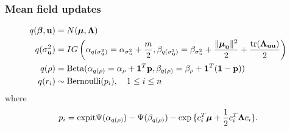 \documentclass{beamer}
\begin{document}
\begin{frame}
\frametitle{Mean field updates}
\begin{align*}
q({\boldsymbol \beta}, {\bf u}) &= N({\boldsymbol \mu}, {\boldsymbol \Lambda}) \\
q(\sigma_{{\bf u}}^2) &= IG\left(\alpha_{q(\sigma_{{\bf u}}^2)} = \alpha_{\sigma_u^2} + \frac{m}{2}, \beta_{q(\sigma_{{\bf u}}^2)} = \beta_{\sigma_u^2} + \frac{\|{\boldsymbol \mu}_{\bf u}\|^2}{2} + \frac{\text{tr}({\boldsymbol \Lambda}_{{\bf u}{\bf u}})}{2}\right) \\
q(\rho) &= \text{Beta}(\alpha_{q(\rho)} = \alpha_\rho + {\bf 1}^T{\bf p}, \beta_{q(\rho)} = \beta_\rho + {\bf 1}^T({\bf 1} - {\bf p})) \\
q(r_i) & \sim \text{Bernoulli}{(p_i)}, \ \ \ 1 \leq i \leq n
\end{align*}
where
$$
p_i = \text{expit} \Psi{(\alpha_{q(\rho)})} - \Psi{(\beta_{q(\rho)})} - \exp{\{c_i^T{\boldsymbol\mu}+ {\frac{1}{2}}c_i^T {\boldsymbol\Lambda}c_i\}}.
$$
\end{frame}


\end{document}
